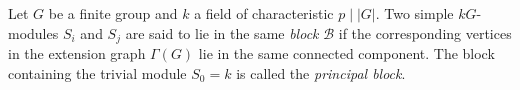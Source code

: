 Let $G$ be a finite group and $k$ a field of characteristic $p \mid |G|$. Two simple $kG$-modules $S_i$ and $S_j$ are said to lie in the same {\it block} $\mathcal{B}$ if the corresponding vertices in the extension graph $\Gamma(G)$ lie in the same connected component. The block containing the trivial module $S_0 = k$ is called the {\it principal block}.
